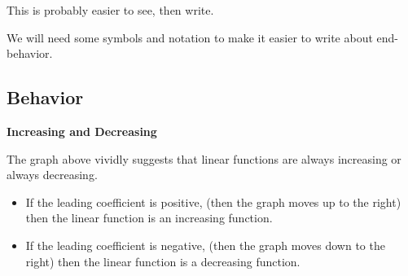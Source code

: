 \documentclass{ximera}
\begin{document}
This is probably easier to see, then write.



\begin{image}
\end{image}


We will need some symbols and notation to make it easier to write about end-behavior. \\




















\subsection*{Behavior}



\textbf{\textcolor{blue!55!black}{Increasing and Decreasing}}






The graph above vividly suggests that linear functions are always increasing or always decreasing.


\begin{itemize}
\item If the leading coefficient is positive, (then the graph moves up to the right) then the linear function is an increasing function.

\item If the leading coefficient is negative, (then the graph moves down to the right) then the linear function is a decreasing function.
\end{itemize}
\end{document}
